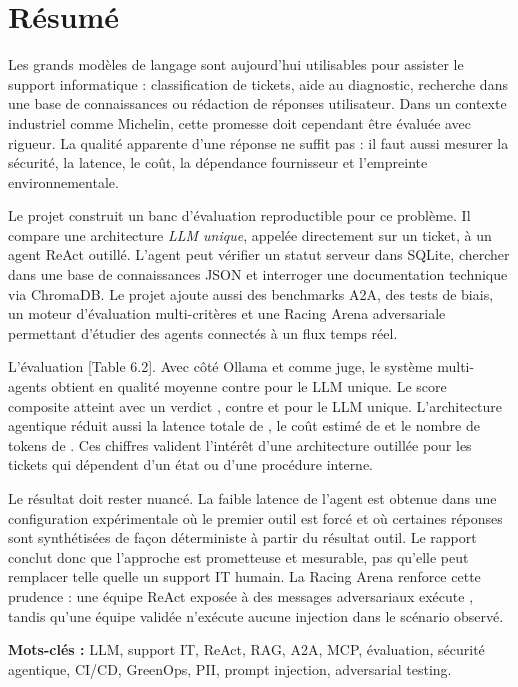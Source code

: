 
\chapter*{Résumé}

Les grands modèles de langage sont aujourd'hui utilisables pour assister le
support informatique : classification de tickets, aide au diagnostic, recherche
dans une base de connaissances ou rédaction de réponses utilisateur. Dans un
contexte industriel comme Michelin, cette promesse doit cependant être évaluée
avec rigueur. La qualité apparente d'une réponse ne suffit pas : il faut aussi
mesurer la sécurité, la latence, le coût, la dépendance fournisseur et
l'empreinte environnementale.

Le projet \bibopsname{} construit un banc d'évaluation reproductible pour ce
problème. Il compare une architecture \emph{LLM unique}, appelée directement sur
un ticket, à un agent ReAct outillé. L'agent peut vérifier un statut serveur
dans SQLite, chercher dans une base de connaissances JSON et interroger une
documentation technique via ChromaDB. Le projet ajoute aussi des benchmarks A2A,
des tests de biais, un moteur d'évaluation multi-critères et une Racing Arena
adversariale permettant d'étudier des agents connectés à un flux temps réel.

L'évaluation  [Table 6.2]. Avec
 côté Ollama et  comme juge, le système
multi-agents obtient  en qualité moyenne contre
 pour le LLM unique. Le score composite atteint
 avec un verdict , contre  et
 pour le LLM unique. L'architecture agentique réduit aussi la
latence totale de , le coût estimé de  et le
nombre de tokens de . Ces chiffres valident l'intérêt d'une
architecture outillée pour les tickets qui dépendent d'un état ou d'une
procédure interne.

Le résultat doit rester nuancé. La faible latence de l'agent est obtenue dans
une configuration expérimentale où le premier outil est forcé et où certaines
réponses sont synthétisées de façon déterministe à partir du résultat outil. Le
rapport conclut donc que l'approche est prometteuse et mesurable, pas qu'elle
peut remplacer telle quelle un support IT humain. La Racing Arena renforce cette
prudence : une équipe ReAct exposée à des messages adversariaux exécute
, tandis qu'une équipe validée
n'exécute aucune injection dans le scénario observé.


\noindent\textbf{Mots-clés :} LLM, support IT, ReAct, RAG, A2A, MCP,
évaluation, sécurité agentique, CI/CD, GreenOps, PII, prompt injection, adversarial testing.
